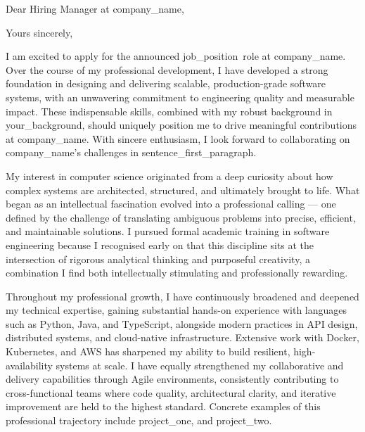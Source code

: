 \documentclass[11pt,a4paper,sans]{moderncv}
\newcommand{\companyname}{company_name}
\newcommand{\rolename}{job_position}
\newcommand{\companychallenge}{sentence_first_paragraph}
\newcommand{\background}{your_background}
\newcommand{\projectone}{project_one}
\newcommand{\projecttwo}{project_two}
\begin{document}
\recipient{Hiring Manager}{\companyname}
\date{\today}
\subject{Application for \rolename}
\opening{Dear Hiring Manager at \companyname,}
\closing{Yours sincerely,}
\vspace{-0.5cm}
\makelettertitle
\justifying
\setlength{\parindent}{6pt}
\setlength{\parskip}{6pt}
\everypar{\hskip\parindent}



I am excited to apply for the announced \rolename\ role at \companyname. Over the course of my professional development, I have developed a strong foundation in designing and delivering scalable, production-grade software systems, with an unwavering commitment to engineering quality and measurable impact. These indispensable skills, combined with my robust background in \background, should uniquely position me to drive meaningful contributions at \companyname. With sincere enthusiasm, I look forward to collaborating on \companyname's challenges in \companychallenge.

My interest in computer science originated from a deep curiosity about how complex systems are architected, structured, and ultimately brought to life. What began as an intellectual fascination evolved into a professional calling — one defined by the challenge of translating ambiguous problems into precise, efficient, and maintainable solutions. I pursued formal academic training in software engineering because I recognised early on that this discipline sits at the intersection of rigorous analytical thinking and purposeful creativity, a combination I find both intellectually stimulating and professionally rewarding.


Throughout my professional growth, I have continuously broadened and deepened my technical expertise, gaining substantial hands-on experience with languages such as Python, Java, and TypeScript, alongside modern practices in API design, distributed systems, and cloud-native infrastructure. Extensive work with Docker, Kubernetes, and AWS has sharpened my ability to build resilient, high-availability systems at scale. I have equally strengthened my collaborative and delivery capabilities through Agile environments, consistently contributing to cross-functional teams where code quality, architectural clarity, and iterative improvement are held to the highest standard. Concrete examples of this professional trajectory include \projectone, and \projecttwo.
\end{document}
